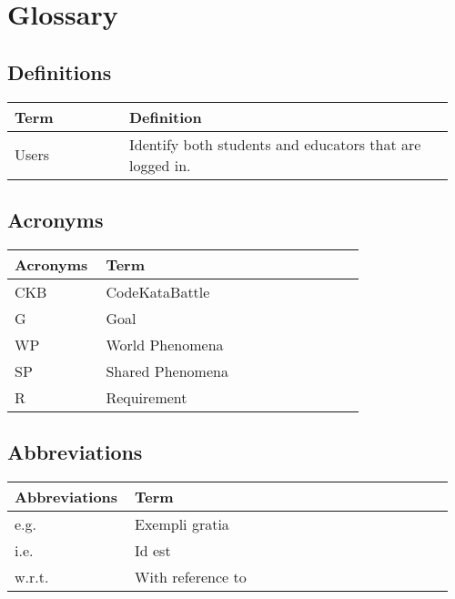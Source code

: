 \section{Glossary}
\subsection{Definitions}
\begin{center}
	\begin{tabular}{@{}p{0.25\linewidth} p{0.71\linewidth}@{}}
		\toprule
		\textbf{Term} & \textbf{Definition}\\
		\midrule
		Users & Identify both students and educators that are logged in. \\
		\bottomrule
	\end{tabular}
\end{center}

\subsection{Acronyms}
\begin{center}
	\begin{tabular}{@{}p{0.25\linewidth} p{0.71\linewidth}@{}}
		\toprule
		\textbf{Acronyms} & \textbf{Term}\\
		\midrule
		CKB & CodeKataBattle\\
            G & Goal\\
		WP & World Phenomena\\
		SP & Shared Phenomena\\
            R & Requirement\\
		\bottomrule
	\end{tabular}
\end{center}

\subsection{Abbreviations}
\begin{center}
	\begin{tabular}{@{}p{0.25\linewidth} p{0.71\linewidth}@{}}
		\toprule
		\textbf{Abbreviations} & \textbf{Term}\\
		\midrule
		e.g. & Exempli gratia\\
		i.e. & Id est\\
		w.r.t. & With reference to\\
		\bottomrule
	\end{tabular}
\end{center}

